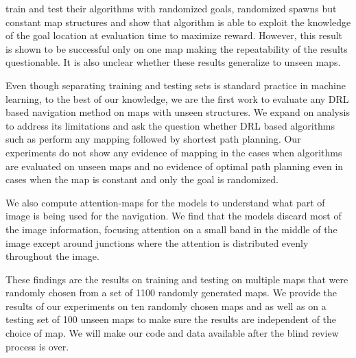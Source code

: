 \cite{MiPaViICLR2017} train and test their algorithms with randomized goals, randomized spawns but constant map structures and show that algorithm is able to exploit the knowledge of the goal location at evaluation time to maximize reward.
However, this result is shown to be successful only on one map making the repeatability of the results questionable.
It is also unclear whether these results generalize to unseen maps.

Even though separating training and testing sets is standard practice in machine learning, to the best of our knowledge, we are the first work to evaluate any DRL based navigation method on maps with unseen structures.
We expand on \cite{MiPaViICLR2017} analysis to address its limitations and ask the question whether DRL based algorithms such as \NavAiiiCDiDiiL{} perform any mapping followed by shortest path planning.
Our experiments do not show any evidence of mapping in the cases when algorithms are evaluated on unseen maps and no evidence of optimal path planning even in cases when the map is constant and only the goal is randomized.

We also compute attention-maps for the models to understand what part of image is being used for the navigation.
We find that the models discard most of the image information, focusing attention on a small band in the middle of the image except around junctions where the attention is distributed evenly throughout the image.

These findings are the results on training and testing on multiple maps that were randomly chosen from a set of 1100 randomly generated maps.
We provide the results of our experiments on ten randomly chosen maps and as well as on a testing set of 100 unseen maps to make sure the results are independent of the choice of map.
We will make our code and data available after the blind review process is over.




